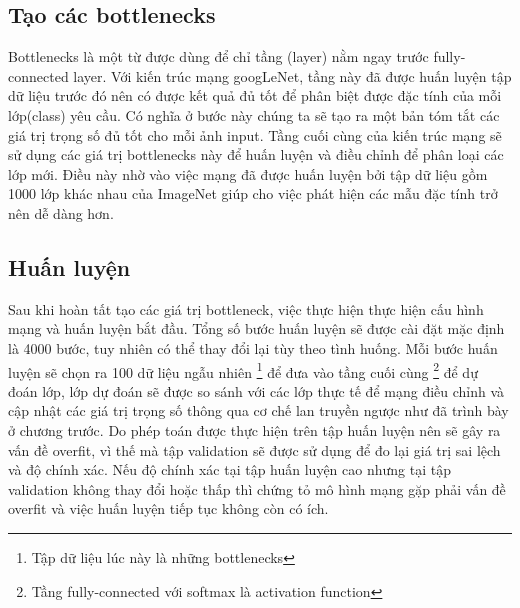 	\subsection{Tạo các bottlenecks}
	
	Bottlenecks\cite{bottlenecks} là một từ được dùng để chỉ tầng (layer) nằm ngay trước fully-connected layer. Với kiến trúc mạng googLeNet, tầng này đã được huấn luyện tập dữ liệu trước đó nên có được kết quả đủ tốt để phân biệt được đặc tính của mỗi lớp(class) yêu cầu. Có nghĩa ở bước này chúng ta sẽ tạo ra một bản tóm tắt các giá trị trọng số đủ tốt cho mỗi ảnh input. Tầng cuối cùng của kiến trúc mạng sẽ sử dụng các giá trị bottlenecks này để huấn luyện và điều chỉnh để phân loại các lớp mới. Điều này nhờ vào việc mạng đã được huấn luyện bởi tập dữ liệu gồm 1000 lớp khác nhau của ImageNet giúp cho việc phát hiện các mẫu đặc tính trở nên dễ dàng hơn.
	
	\subsection{Huấn luyện}
	
	Sau khi hoàn tất tạo các giá trị bottleneck, việc thực hiện thực hiện cấu hình mạng và huấn luyện bắt đầu. Tổng số bước huấn luyện sẽ được cài đặt mặc định là 4000 bước, tuy nhiên có thể thay đổi lại tùy theo tình huống. Mỗi bước huấn luyện sẽ chọn ra 100 dữ liệu ngẫu nhiên \footnote{Tập dữ liệu lúc này là những bottlenecks} để đưa vào tầng cuối cùng \footnote{Tầng fully-connected với softmax là activation function} để dự đoán lớp, lớp dự đoán sẽ được so sánh với các lớp thực tế để mạng điều chỉnh và cập nhật các giá trị trọng số thông qua cơ chế lan truyền ngược như đã trình bày ở chương trước. Do phép toán được thực hiện trên tập huấn luyện nên sẽ  gây ra vấn đề overfit, vì thế mà tập validation sẽ được sử dụng để đo lại giá trị sai lệch và độ chính xác. Nếu độ chính xác tại tập huấn luyện cao nhưng tại tập validation không thay đổi hoặc thấp thì chứng tỏ mô hình mạng gặp phải vấn đề overfit và việc huấn luyện tiếp tục không còn có ích.
	


